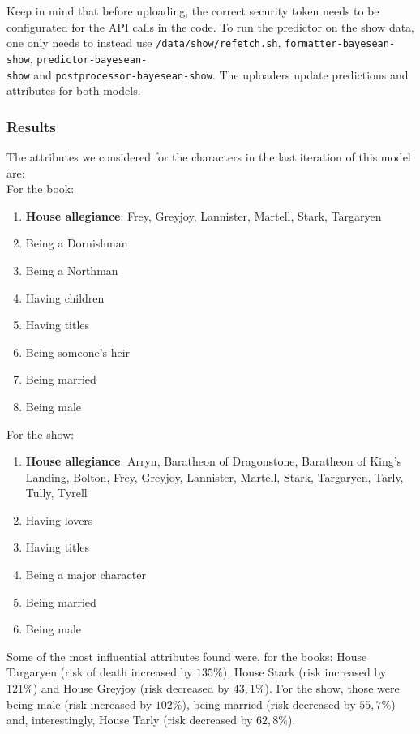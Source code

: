 \documentclass{bioinfo}
\begin{document}
Keep in mind that before uploading, the correct security token needs to be configurated for the API calls in the code. To run the predictor on the show data, one only needs to instead use \texttt{/data/show/refetch.sh}, \texttt{formatter-bayesean-show}, \texttt{predictor-bayesean-\\show} and  \texttt{postprocessor-bayesean-show}. The uploaders update predictions and attributes for both models.

\subsubsection{Results}
The attributes we considered for the characters in the last iteration of this model are:\\
For the book:
\begin{enumerate}
    \item \textbf{House allegiance}: Frey, Greyjoy, Lannister, Martell, Stark, Targaryen
    \item Being a Dornishman
    \item Being a Northman
    \item Having children
    \item Having titles
    \item Being someone's heir
    \item Being married
    \item Being male
\end{enumerate}
For the show:
\begin{enumerate}
    \item \textbf{House allegiance}: Arryn, Baratheon of Dragonstone, Baratheon of King{'}s Landing, Bolton, Frey, Greyjoy, Lannister, Martell, Stark, Targaryen, Tarly, Tully, Tyrell
    \item Having lovers
    \item Having titles
    \item Being a major character
    \item Being married
    \item Being male
\end{enumerate}

Some of the most influential attributes found were, for the books: House Targaryen (risk of death increased by $135\%$), House Stark (risk increased by $121\%$) and House Greyjoy (risk decreased by $43,1\%$). For the show, those were being male (risk  increased by $102\%$), being married (risk decreased by $55,7\%$) and, interestingly, House Tarly (risk decreased by $62,8\%$).
\end{document}

